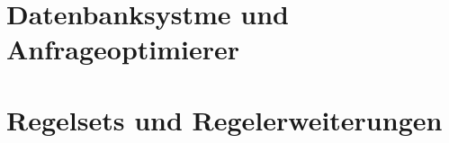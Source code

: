 








\section{Datenbanksystme und Anfrageoptimierer}





\section{Regelsets und Regelerweiterungen}



